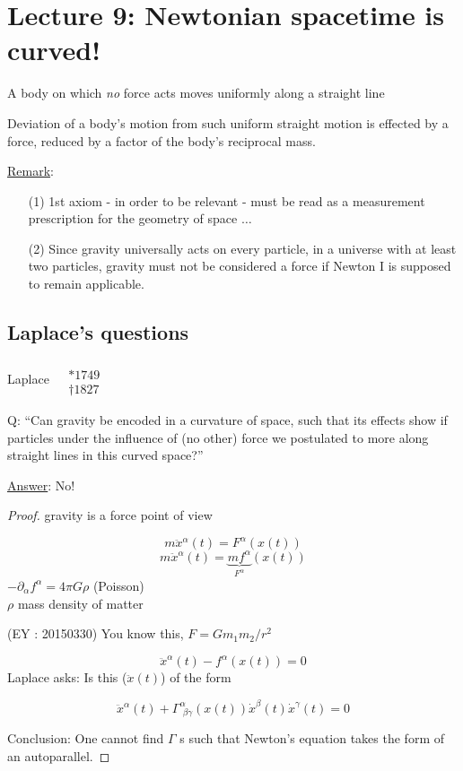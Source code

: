 \section{Lecture 9: Newtonian spacetime is curved!}

\begin{axiom}[Newton I:]
  A body on which \emph{no} force acts moves uniformly along a straight line 
\end{axiom}

\begin{axiom}[Newton II:]
Deviation of a body's motion from such uniform straight motion is effected by a force, reduced by a factor of the body's reciprocal mass.  
\end{axiom}

\underline{Remark}: \begin{enumerate}
\item[(1)] 1st axiom - in order to be relevant - must be read as a measurement prescription for the geometry of space $\dots $
\item[(2)] Since gravity universally acts on every particle, in a universe with at least two particles, gravity must not be considered a force if Newton I is supposed to remain applicable.  
\end{enumerate}

\subsection{Laplace's questions} Laplace $\begin{aligned}  & \quad \\ 
  & * 1749 \\
  & \dag 1827  \end{aligned}$

Q: ``Can gravity be encoded in a curvature of space, such that its effects show if particles under the influence of (no other) force we postulated to more along straight lines in this curved space?''

\underline{Answer}: No!

\begin{proof}
gravity is a force point of view


\[
m \ddot{x}^{\alpha}(t) = F^{\alpha}(x(t))
\]
\[
m\ddot{x}^{\alpha}(t) = \underbrace{mf^{\alpha}}_{F^{\alpha}}(x(t))
\]
$-\partial_{\alpha} f^{\alpha} = 4\pi G\rho$ (Poisson) \\
$\rho $ mass density of matter

(EY : 20150330) You know this, $F=Gm_1m_2/r^2$

\[
\ddot{x}^{\alpha}(t) - f^{\alpha}(x(t)) = 0 
\]
Laplace asks: Is this ($\ddot{x}(t)$) of the form 

\[
\ddot{x}^{\alpha}(t) + \Gamma^{\alpha}_{\, \, \beta \gamma}(x(t)) \dot{x}^{\beta}(t) \dot{x}^{\gamma}(t) = 0 
\]

Conclusion: One cannot find $\Gamma$ s such that Newton's equation takes the form of an autoparallel.

\end{proof}

